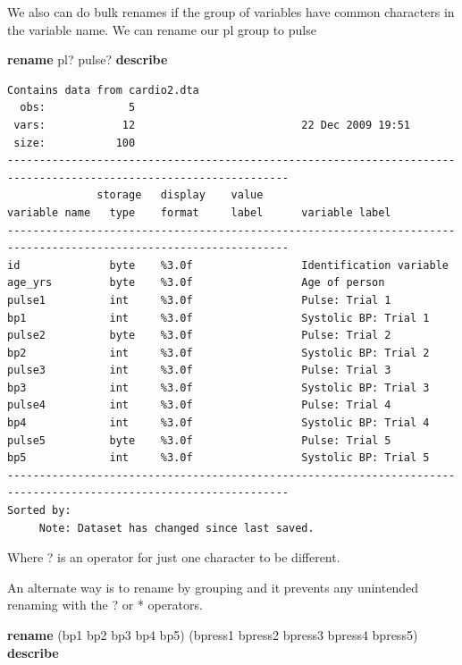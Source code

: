 \documentclass[
]{book}
\newenvironment{Shaded}{\begin{snugshade}}{\end{snugshade}}
\newcommand{\KeywordTok}[1]{\textcolor[rgb]{0.13,0.29,0.53}{\textbf{#1}}}
\newcommand{\NormalTok}[1]{#1}
\begin{document}
We also can do bulk renames if the group of variables have common
characters in the variable name. We can rename our pl group to pulse

\begin{Shaded}
\begin{Highlighting}[]
\KeywordTok{rename}\NormalTok{ pl? pulse? }
\KeywordTok{describe}
\end{Highlighting}
\end{Shaded}

\begin{verbatim}
Contains data from cardio2.dta
  obs:             5                          
 vars:            12                          22 Dec 2009 19:51
 size:           100                          
------------------------------------------------------------------------------------------------------------------
              storage   display    value
variable name   type    format     label      variable label
------------------------------------------------------------------------------------------------------------------
id              byte    %3.0f                 Identification variable
age_yrs         byte    %3.0f                 Age of person
pulse1          int     %3.0f                 Pulse: Trial 1
bp1             int     %3.0f                 Systolic BP: Trial 1
pulse2          byte    %3.0f                 Pulse: Trial 2
bp2             int     %3.0f                 Systolic BP: Trial 2
pulse3          int     %3.0f                 Pulse: Trial 3
bp3             int     %3.0f                 Systolic BP: Trial 3
pulse4          int     %3.0f                 Pulse: Trial 4
bp4             int     %3.0f                 Systolic BP: Trial 4
pulse5          byte    %3.0f                 Pulse: Trial 5
bp5             int     %3.0f                 Systolic BP: Trial 5
------------------------------------------------------------------------------------------------------------------
Sorted by: 
     Note: Dataset has changed since last saved.
\end{verbatim}

Where ? is an operator for just one character to be different.

An alternate way is to rename by grouping and it prevents any unintended renaming with the ? or * operators.

\begin{Shaded}
\begin{Highlighting}[]
\KeywordTok{rename}\NormalTok{ (bp1 bp2 bp3 bp4 bp5) (bpress1 bpress2 bpress3 bpress4 bpress5)}
\KeywordTok{describe}
\end{Highlighting}
\end{Shaded}
\end{document}
